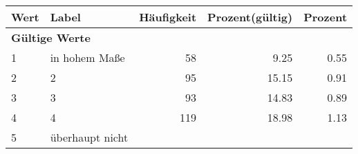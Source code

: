      \begin{longtable}{lXrrr}
     \toprule
     \textbf{Wert} & \textbf{Label} & \textbf{Häufigkeit} & \textbf{Prozent(gültig)} & \textbf{Prozent} \\
     \endhead
     \midrule
     \multicolumn{5}{l}{\textbf{Gültige Werte}}\\

     1 &
     \multicolumn{1}{X}{ in hohem Maße   } &


       \num{58} &
       \num[round-mode=places,round-precision=2]{9.25} &
         \num[round-mode=places,round-precision=2]{0.55} \\

     2 &
     \multicolumn{1}{X}{ 2   } &


       \num{95} &
       \num[round-mode=places,round-precision=2]{15.15} &
         \num[round-mode=places,round-precision=2]{0.91} \\

     3 &
     \multicolumn{1}{X}{ 3   } &


       \num{93} &
       \num[round-mode=places,round-precision=2]{14.83} &
         \num[round-mode=places,round-precision=2]{0.89} \\

     4 &
     \multicolumn{1}{X}{ 4   } &


       \num{119} &
       \num[round-mode=places,round-precision=2]{18.98} &
         \num[round-mode=places,round-precision=2]{1.13} \\

     5 &
     \multicolumn{1}{X}{ überhaupt nicht   } &



\end{longtable}
